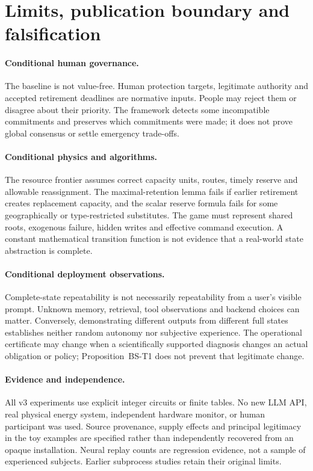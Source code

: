 \section{Limits, publication boundary and falsification}
\paragraph{Conditional human governance.}
The baseline is not value-free. Human protection targets, legitimate authority and accepted retirement deadlines are normative inputs. People may reject them or disagree about their priority. The framework detects some incompatible commitments and preserves which commitments were made; it does not prove global consensus or settle emergency trade-offs.

\paragraph{Conditional physics and algorithms.}
The resource frontier assumes correct capacity units, routes, timely reserve and allowable reassignment. The maximal-retention lemma fails if earlier retirement creates replacement capacity, and the scalar reserve formula fails for some geographically or type-restricted substitutes. The game must represent shared roots, exogenous failure, hidden writes and effective command execution. A constant mathematical transition function is not evidence that a real-world state abstraction is complete.

\paragraph{Conditional deployment observations.}
Complete-state repeatability is not necessarily repeatability from a user's visible prompt. Unknown memory, retrieval, tool observations and backend choices can matter. Conversely, demonstrating different outputs from different full states establishes neither random autonomy nor subjective experience. The operational certificate may change when a scientifically supported diagnosis changes an actual obligation or policy; Proposition~BS-T1 does not prevent that legitimate change.

\paragraph{Evidence and independence.}
All v3 experiments use explicit integer circuits or finite tables. No new LLM API, real physical energy system, independent hardware monitor, or human participant was used. Source provenance, supply effects and principal legitimacy in the toy examples are specified rather than independently recovered from an opaque installation. Neural replay counts are regression evidence, not a sample of experienced subjects. Earlier subprocess studies retain their original limits.

